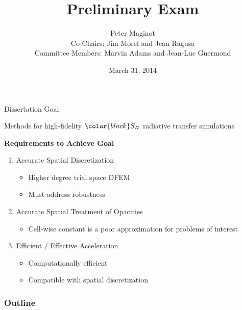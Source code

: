 \documentclass{beamer}
\title{Preliminary Exam}
\author{Peter Maginot \\ Co-Chairs: Jim Morel and Jean Ragusa \\ Committee Members: Marvin Adams and Jean-Luc Guermond}
\institute{Texas A\&M University- Department of Nuclear Engineering}
\date{March 31, 2014 }
\newif\ifplacelogo %
\begin{document}
\placelogofalse
\begin{frame}
\titlepage
\end{frame}

\begin{frame}
\begin{block}{Dissertation Goal}
\begin{center}
Methods for high-fidelity $ \color{black} S_N $ radiative transfer simulations
\end{center}
\end{block}
\begin{center}
\begin{Large}
\bf
Requirements to Achieve Goal
\end{Large}
\end{center}
\begin{enumerate}
\item Accurate Spatial Discretization
\begin{itemize}
\item Higher degree trial space DFEM
\item Must address robustness
\end{itemize}
\item Accurate Spatial Treatment of Opacities
\begin{itemize}
\item Cell-wise constant is a poor approximation for problems of interest
\end{itemize}
\item Efficient / Effective Acceleration
\begin{itemize}
\item Computationally efficient
\item Compatible with spatial discretization
\end{itemize}
\end{enumerate}

\end{frame}

\begin{frame}
\frametitle{Outline}
\tableofcontents[hideallsubsections]
\end{frame}
\end{document}
